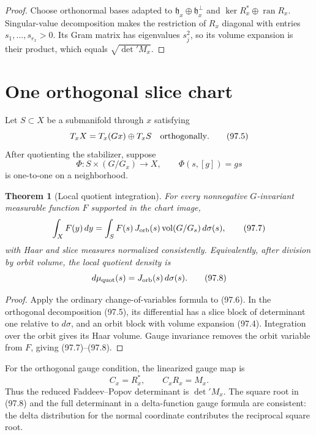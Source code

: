 \documentclass[11pt]{article}
\newtheorem{theorem}{Theorem}[section]
\theoremstyle{remark}
\begin{document}
\begin{proof}
Choose orthonormal bases adapted to
\(\mathfrak h_x\oplus\mathfrak h_x^\perp\) and
\(\ker R_x^*\oplus\operatorname{ran}R_x\).  Singular-value
decomposition makes the restriction of \(R_x\) diagonal with
entries \(s_1,\ldots,s_{r_x}>0\).  Its Gram matrix has eigenvalues
\(s_j^2\), so its volume expansion is their product, which equals
\(\sqrt{\det{}'M_x}\).
\end{proof}

\section{One orthogonal slice chart}

Let \(S\subset X\) be a submanifold through \(x\) satisfying
\[
 T_xX=T_x(Gx)\oplus T_xS
 \quad\hbox{orthogonally}.                             \tag{97.5}
\]
After quotienting the stabilizer, suppose
\[
 \Phi:S\times(G/G_x)\longrightarrow X,\qquad
 \Phi(s,[g])=gs                                      \tag{97.6}
\]
is one-to-one on a neighborhood.

\begin{theorem}[Local quotient integration]
\label{thm:v15v97-coarea}
For every nonnegative \(G\)-invariant measurable function \(F\)
supported in the chart image,
\[
 \int_XF(y)\,dy
 =\int_S F(s)\,J_{\rm orb}(s)\,
       {\rm vol}(G/G_s)\,d\sigma(s),                  \tag{97.7}
\]
with Haar and slice measures normalized consistently.  Equivalently,
after division by orbit volume, the local quotient density is
\[
 d\mu_{\rm quot}(s)=J_{\rm orb}(s)\,d\sigma(s).        \tag{97.8}
\]
\end{theorem}

\begin{proof}
Apply the ordinary change-of-variables formula to (97.6).  In the
orthogonal decomposition (97.5), its differential has a slice
block of determinant one relative to \(d\sigma\), and an orbit
block with volume expansion (97.4).  Integration over the orbit
gives its Haar volume.  Gauge invariance removes the orbit variable
from \(F\), giving (97.7)--(97.8).
\end{proof}

For the orthogonal gauge condition, the linearized gauge map is
\[
 C_x=R_x^*,\qquad C_xR_x=M_x.                         \tag{97.9}
\]
Thus the reduced Faddeev--Popov determinant is
\(\det{}'M_x\).  The square root in (97.8) and the full determinant
in a delta-function gauge formula are consistent: the delta
distribution for the normal coordinate contributes the reciprocal
square root.
\end{document}
